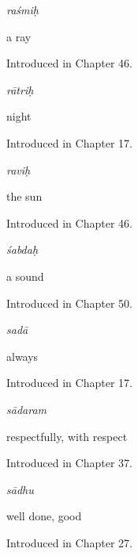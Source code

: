 \noindent\begin{minipage}[t]{\linewidth}
\raggedright
\textbf{}\enspace\emph{raśmiḥ}\par
\small a ray\par
\footnotesize Introduced in Chapter 46.
\end{minipage}\par\medskip

\noindent\begin{minipage}[t]{\linewidth}
\raggedright
\textbf{}\enspace\emph{rātriḥ}\par
\small night\par
\footnotesize Introduced in Chapter 17.
\end{minipage}\par\medskip

\noindent\begin{minipage}[t]{\linewidth}
\raggedright
\textbf{}\enspace\emph{raviḥ}\par
\small the sun\par
\footnotesize Introduced in Chapter 46.
\end{minipage}\par\medskip

\noindent\begin{minipage}[t]{\linewidth}
\raggedright
\textbf{}\enspace\emph{śabdaḥ}\par
\small a sound\par
\footnotesize Introduced in Chapter 50.
\end{minipage}\par\medskip

\noindent\begin{minipage}[t]{\linewidth}
\raggedright
\textbf{}\enspace\emph{sadā}\par
\small always\par
\footnotesize Introduced in Chapter 17.
\end{minipage}\par\medskip

\noindent\begin{minipage}[t]{\linewidth}
\raggedright
\textbf{}\enspace\emph{sādaram}\par
\small respectfully, with respect\par
\footnotesize Introduced in Chapter 37.
\end{minipage}\par\medskip

\noindent\begin{minipage}[t]{\linewidth}
\raggedright
\textbf{}\enspace\emph{sādhu}\par
\small well done, good\par
\footnotesize Introduced in Chapter 27.
\end{minipage}\par\medskip

